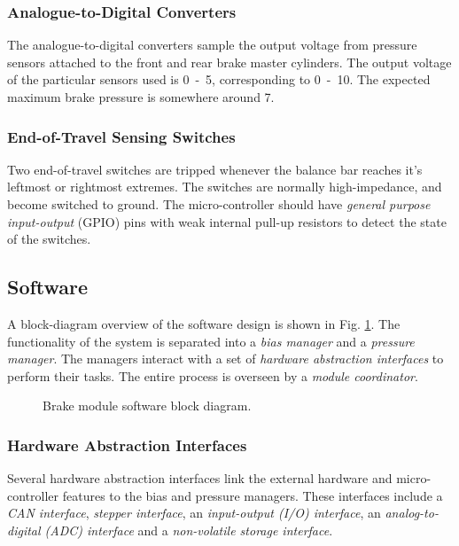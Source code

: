 \subsubsection{Analogue-to-Digital Converters}

The analogue-to-digital converters sample the output voltage from pressure sensors attached to the front and rear brake master cylinders. The output voltage of the particular sensors used is \unit{0-5}{\volt}, corresponding to \unit{0-10}{\mega\pascal}. The expected maximum brake pressure is somewhere around \unit{7}{\mega\pascal}.

\subsubsection{End-of-Travel Sensing Switches}

Two end-of-travel switches are tripped whenever the balance bar reaches it's leftmost or rightmost extremes. The switches are normally high-impedance, and become switched to ground. The micro-controller should have \emph{general purpose input-output} (GPIO) pins with weak internal pull-up resistors to detect the state of the switches.

\subsection{Software}

A block-diagram overview of the software design is shown in Fig. \ref{fig:brake_software_design_block}. The functionality of the system is separated into a \emph{bias manager} and a \emph{pressure manager}. The managers interact with a set of \emph{hardware abstraction interfaces} to perform their tasks. The entire process is overseen by a \emph{module coordinator}.

\begin{figure}[H]
	\centering
	
	\caption{Brake module software block diagram.}
	\label{fig:brake_software_design_block}
\end{figure}


\subsubsection{Hardware Abstraction Interfaces}

Several hardware abstraction interfaces link the external hardware and micro-controller features to the bias and pressure managers. These interfaces include a \emph{CAN interface}, \emph{stepper interface}, an \emph{input-output (I/O) interface}, an \emph{analog-to-digital (ADC) interface} and a \emph{non-volatile storage interface}.

